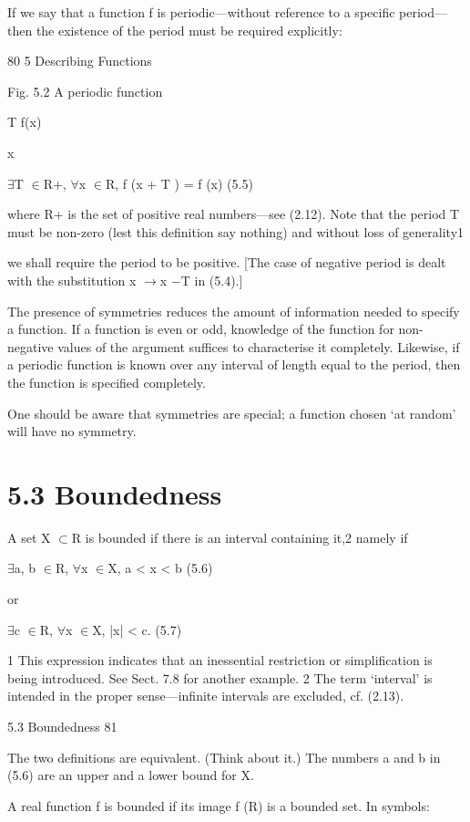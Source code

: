 \documentclass[11pt]{article}
\theoremstyle{plain}
\theoremstyle{definition}
\begin{document}
If we say that a function f is periodic---without reference to a specific period--- then the existence of the period must be required explicitly:

80 5 Describing Functions

Fig. 5.2 A periodic function

T f(x)

x

$\exists$T $\in$R+, $\forall$x $\in$R, f (x + T ) = f (x) (5.5)

where R+ is the set of positive real numbers---see (2.12). Note that the period T must be non-zero (lest this definition say nothing) and without loss of generality1

we shall require the period to be positive. [The case of negative period is dealt with the substitution x $\to$x $-$T in (5.4).]

The presence of symmetries reduces the amount of information needed to specify a function. If a function is even or odd, knowledge of the function for non-negative values of the argument suffices to characterise it completely. Likewise, if a periodic function is known over any interval of length equal to the period, then the function is specified completely.

One should be aware that symmetries are special; a function chosen `at random' will have no symmetry.

\section{5.3 Boundedness}

A set X $\subset$R is bounded if there is an interval containing it,2 namely if

$\exists$a, b $\in$R, $\forall$x $\in$X, a < x < b (5.6)

or

$\exists$c $\in$R, $\forall$x $\in$X, |x| < c. (5.7)

1 This expression indicates that an inessential restriction or simplification is being introduced. See Sect. 7.8 for another example. 2 The term `interval' is intended in the proper sense---infinite intervals are excluded, cf. (2.13).

5.3 Boundedness 81

The two definitions are equivalent. (Think about it.) The numbers a and b in (5.6) are an upper and a lower bound for X.

A real function f is bounded if its image f (R) is a bounded set. In symbols:
\end{document}
